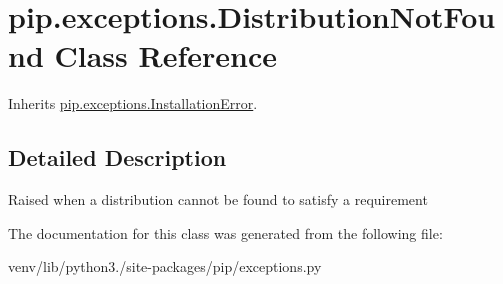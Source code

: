 \hypertarget{classpip_1_1exceptions_1_1_distribution_not_found}{}\section{pip.\+exceptions.\+Distribution\+Not\+Found Class Reference}
\label{classpip_1_1exceptions_1_1_distribution_not_found}


Inherits \hyperlink{classpip_1_1exceptions_1_1_installation_error}{pip.\+exceptions.\+Installation\+Error}.



\subsection{Detailed Description}
\begin{DoxyVerb}Raised when a distribution cannot be found to satisfy a requirement\end{DoxyVerb}
 

The documentation for this class was generated from the following file\+:\begin{DoxyCompactItemize}
\item 
venv/lib/python3./site-\/packages/pip/exceptions.\+py\end{DoxyCompactItemize}
